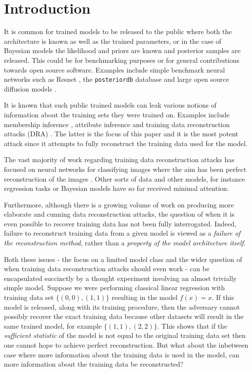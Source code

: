 \documentclass[hyperref]{article}
\theoremstyle{plain}
\theoremstyle{remark}
\begin{document}
\section{Introduction}\label{sec:introduction}
It is common for trained models to be released to the public where both the architecture is known as well as the trained parameters, or in the case of Bayesian models the likelihood and priors are known and posterior samples are released. This could be for benchmarking purposes or for general contributions towards open source software. Examples include simple benchmark neural networks such as Resnet \citep{He_2016_CVPR}, the \texttt{posteriordb} database \citep{posteriordb} and large open source diffusion models \citep{Rombach_2022_CVPR}.

It is known that such public trained models can leak various notions of information about the training sets they were trained on. Examples include membership inference \citep{membership_inference}, attribute inference \citep{attribute_inference} and training data reconstruction attacks (DRA) \citep{Haim2022,buzaglo2023deconstructing,Loo2023,Runkel2024,Guo2022_bounding,Hayes203_dpsgd,Kaissis2023_hypothesis}. The latter is the focus of this paper and it is the most potent attack since it attempts to fully reconstruct the training data used for the model.

The vast majority of work regarding training data reconstruction attacks has focused on neural networks for classifying images where the aim has been perfect reconstruction of the images \citep{Haim2022,Guo2022_bounding,Loo2023,Zhu2019_leakage}. Other sorts of data and other models, for instance regression tasks or Bayesian models have so far received minimal attention.

Furthermore, although there is a growing volume of work on producing more elaborate and cunning data reconstruction attacks, the question of when it is even possible to recover training data has not been fully interrogated. Indeed, failure to reconstruct training data from a given model is viewed as a \textit{failure of the reconstruction method}, rather than a \textit{property of the model architecture itself}. 

Both these issues - the focus on a limited model class and the wider question of when training data reconstruction attacks should even work - can be encapsulated succinctly by a thought experiment involving an almost trivially simple model. Suppose we were performing classical linear regression with training data set $\{(0,0),(1,1)\}$ resulting in the model $f(x) = x$. If this model is released, along with its training procedure, then the adversary cannot possibly recover the exact training data because other datasets will result in the same trained model, for example $\{(1,1),(2,2)\}$. This shows that if the \textit{sufficient statistic} of the model is not equal to the original training data set then one cannot hope to achieve perfect reconstruction. But what about the inbetween case where more information about the training data is used in the model, can more information about the training data be reconstructed?
\end{document}
